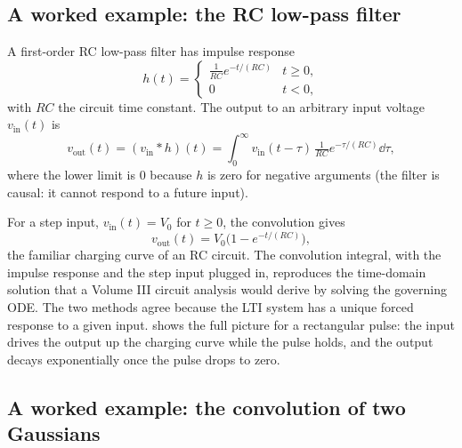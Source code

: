 \subsection{A worked example: the RC low-pass filter}

A first-order RC low-pass filter has impulse response
\[
h(t) = \begin{cases}
\frac{1}{RC} e^{-t / (RC)} & t \geq 0, \\
0 & t < 0,
\end{cases}
\]
with $RC$ the circuit time constant. The output to an arbitrary
input voltage $v_{\mathrm{in}}(t)$ is
\[
v_{\mathrm{out}}(t) = (v_{\mathrm{in}} * h)(t) =
\int_{0}^{\infty} v_{\mathrm{in}}(t - \tau) \, \tfrac{1}{RC}
e^{-\tau / (RC)} \dd \tau,
\]
where the lower limit is $0$ because $h$ is zero for negative
arguments (the filter is causal: it cannot respond to a future
input).

For a step input, $v_{\mathrm{in}}(t) = V_{0}$ for $t \geq 0$, the
convolution gives
\[
v_{\mathrm{out}}(t) = V_{0}\bigl(1 - e^{-t / (RC)}\bigr),
\]
the familiar charging curve of an RC circuit. The convolution
integral, with the impulse response and the step input plugged in,
reproduces the time-domain solution that a Volume III circuit
analysis would derive by solving the governing ODE. The two
methods agree because the LTI system has a unique forced response
to a given input.
 shows the full picture for a
rectangular pulse: the input drives the output up the charging
curve while the pulse holds, and the output decays exponentially
once the pulse drops to zero.



\subsection{A worked example: the convolution of two Gaussians}

